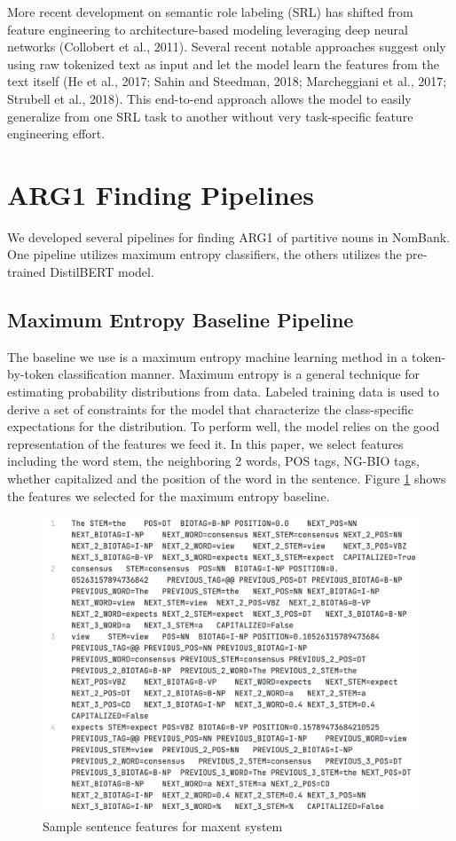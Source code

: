 \documentclass[11pt]{article}
\begin{document}
More recent development on semantic role labeling (SRL) has shifted from feature engineering to architecture-based modeling leveraging deep neural networks (Collobert
et al., 2011). Several recent notable approaches suggest only using raw tokenized text as input and let the model learn the features from the text itself (He et al., 2017; Sahin and Steedman, 2018; Marcheggiani et al., 2017; Strubell et al., 2018). This end-to-end approach allows the model to easily generalize from one SRL task to another without very task-specific feature engineering effort.

\section{ARG1 Finding Pipelines}

We developed several pipelines for finding ARG1 of partitive nouns in NomBank. One pipeline utilizes maximum entropy classifiers, the others utilizes the pre-trained DistilBERT model.

\subsection{Maximum Entropy Baseline Pipeline}

The baseline we use is a maximum entropy machine learning method in a token-by-token classification manner. Maximum entropy is a general technique for estimating probability distributions from data. Labeled training data
is used to derive a set of constraints for the model that
characterize the class-specific expectations for the distribution. To perform well, the model relies on the good representation of the features we feed it. In this paper, we select features including the word stem, the neighboring 2 words, POS tags, NG-BIO tags, whether capitalized and the position of the word in the sentence. Figure \ref{fig:maxent-feature-sample} shows the features we selected for the maximum entropy baseline.

\begin{figure}[h]
  \centering
  \includegraphics[width=\linewidth]{assets/maxent-feature-sample.png}
  \caption{Sample sentence features for maxent system}
  \label{fig:maxent-feature-sample}
\end{figure}
\end{document}
